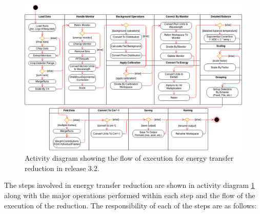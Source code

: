 \documentclass[paper=a4, fontsize=11pt]{scrartcl}	%
\numberwithin{equation}{section}															%
\numberwithin{figure}{section}																%
\numberwithin{table}{section}																%
\begin{document}
\begin{figure}[H]
\centering
\includegraphics[width=1\textwidth]{img/uml/activity_diagrams/EnergyTransfer_activity.png}
\caption{Activity diagram showing the flow of execution for energy transfer reduction in release 3.2.}
\label{fig:c2e-energy-transfer-activity-diagram}
\end{figure}

The steps involved in energy transfer reduction are shown in activity diagram \ref{fig:c2e-energy-transfer-activity-diagram} along with the major operations performed within each step and the flow of the execution of the reduction. The responsibility of each of the steps are as follows:
\end{document}
